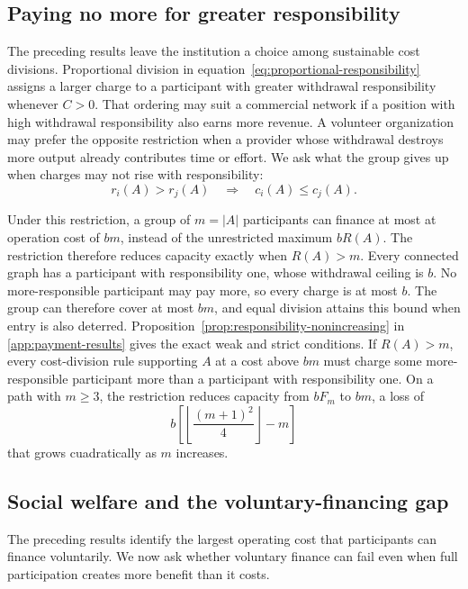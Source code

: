 \documentclass[preprint,12pt,authoryear]{elsarticle}
\begin{document}
\subsection{Paying no more for greater responsibility}
\label{subsec:responsibility-order}

The preceding results leave the institution a choice among sustainable cost
divisions. Proportional division in
equation~\eqref{eq:proportional-responsibility} assigns a larger charge to a
participant with greater withdrawal responsibility whenever \(C>0\). That
ordering may suit a commercial network if a position with high withdrawal
responsibility also earns more revenue. A volunteer organization may prefer
the opposite restriction when a provider whose withdrawal destroys more
output already contributes time or effort.  We ask what the group gives up when charges may
not rise with responsibility:
\[
 r_i(A)>r_j(A)
 \quad\Longrightarrow\quad
 c_i(A)\leq c_j(A).
\]

Under this restriction, a group of \(m=|A|\) participants can finance at most at operation cost of 
\(bm\), instead of the unrestricted maximum \(bR(A)\). The restriction
therefore reduces capacity exactly when \(R(A)>m\). Every connected graph has
a participant with
responsibility one, whose withdrawal ceiling is \(b\). No more-responsible
participant may pay more, so every charge is at most \(b\).
The group can therefore cover at most \(bm\), and equal division attains this
bound when entry is also deterred.
Proposition~\ref{prop:responsibility-nonincreasing} in
\ref{app:payment-results} gives the exact weak and strict conditions.
If \(R(A)>m\), every cost-division rule supporting \(A\) at a cost above \(bm\)
must charge some more-responsible participant more than a participant with
responsibility one. On a path with \(m\geq3\), the restriction reduces capacity from
\(bF_m\) to \(bm\), a loss of
\[
b\left[
 \left\lfloor\frac{(m+1)^2}{4}\right\rfloor-m
 \right]
\]
that grows cuadratically as $m$ increases.

\subsection{Social welfare and the voluntary-financing gap}
\label{subsec:welfare}

The preceding results identify the largest operating cost that participants
can finance voluntarily. We now ask whether voluntary finance can fail even
when full participation creates more benefit than it costs.
\end{document}
